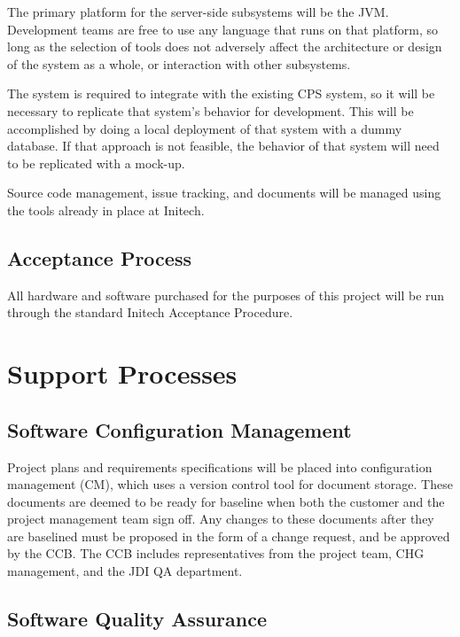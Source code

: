 \documentclass[11pt]{article}
\begin{document}
The primary platform for the server-side subsystems will be the JVM.  Development teams are free to
use any language that runs on that platform, so long as the selection of tools does not adversely
affect the architecture or design of the system as a whole, or interaction with other subsystems.

The system is required to integrate with the existing CPS system, so it will be necessary to
replicate that system's behavior for development.  This will be accomplished by doing a local
deployment of that system with a dummy database.  If that approach is not feasible, the behavior of
that system will need to be replicated with a mock-up.

Source code management, issue tracking, and documents will be managed using the tools already in
place at Initech.


\subsection{Acceptance Process}
All hardware and software purchased for the purposes of this project will be run through the
standard Initech Acceptance Procedure.



\section{Support Processes}

\subsection{Software Configuration Management}
Project plans and requirements specifications will be placed into configuration management (CM),
which uses a version control tool for document storage.  These documents are deemed to be ready for
baseline when both the customer and the project management team sign off.  Any changes to these
documents after they are baselined must be proposed in the form of a change request, and be approved
by the CCB.  The CCB includes representatives from the project team, CHG management, and the JDI QA
department.


\subsection{Software Quality Assurance}
\end{document}
